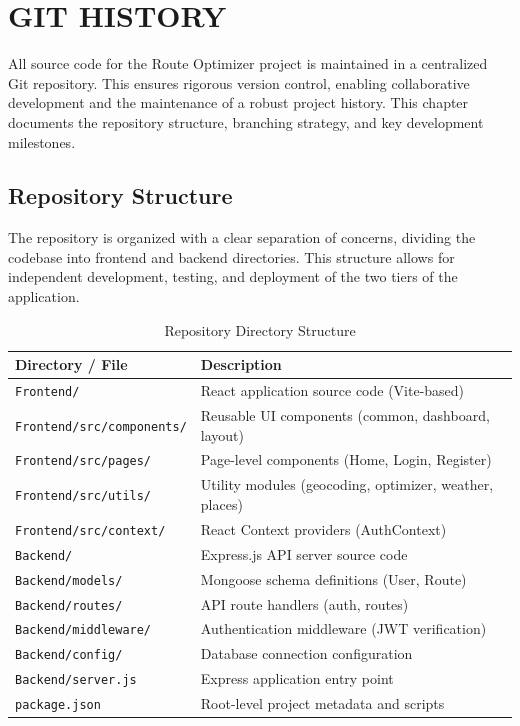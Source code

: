 \chapter{GIT HISTORY}
All source code for the Route Optimizer project is maintained in a centralized Git repository. This ensures rigorous version control, enabling collaborative development and the maintenance of a robust project history. This chapter documents the repository structure, branching strategy, and key development milestones.

\section{Repository Structure}
The repository is organized with a clear separation of concerns, dividing the codebase into frontend and backend directories. This structure allows for independent development, testing, and deployment of the two tiers of the application.

\begin{table}[H]
    \centering
    \renewcommand{\arraystretch}{1.3}
    \small
    \begin{tabular}{|p{4cm}|p{9cm}|}
        \hline
        \textbf{Directory / File} & \textbf{Description} \\
        \hline
        \texttt{Frontend/} & React application source code (Vite-based) \\
        \hline
        \texttt{Frontend/src/components/} & Reusable UI components (common, dashboard, layout) \\
        \hline
        \texttt{Frontend/src/pages/} & Page-level components (Home, Login, Register) \\
        \hline
        \texttt{Frontend/src/utils/} & Utility modules (geocoding, optimizer, weather, places) \\
        \hline
        \texttt{Frontend/src/context/} & React Context providers (AuthContext) \\
        \hline
        \texttt{Backend/} & Express.js API server source code \\
        \hline
        \texttt{Backend/models/} & Mongoose schema definitions (User, Route) \\
        \hline
        \texttt{Backend/routes/} & API route handlers (auth, routes) \\
        \hline
        \texttt{Backend/middleware/} & Authentication middleware (JWT verification) \\
        \hline
        \texttt{Backend/config/} & Database connection configuration \\
        \hline
        \texttt{Backend/server.js} & Express application entry point \\
        \hline
        \texttt{package.json} & Root-level project metadata and scripts \\
        \hline
    \end{tabular}
    \caption{Repository Directory Structure}
    \label{tab:repo_structure}
\end{table}


